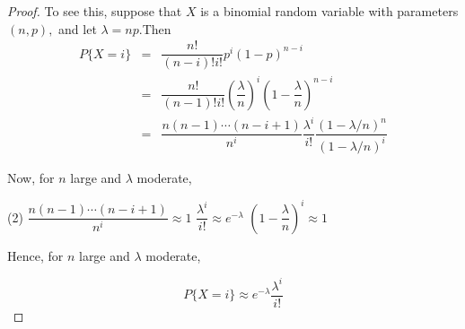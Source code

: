 \begin{proof}

To see this, suppose that $X$ is a binomial random variable with parameters $(n,p),$ and let $\lambda = np$.Then
	\begin{eqnarray*}
		P\{X = i\} &=& \dfrac{n!}{(n-i)!i!}p^i(1 - p)^{n - i}\\
		&=& \dfrac{n!}{(n-1)!i!}\left(\dfrac{\lambda}{n}\right)^i\left(1 - \dfrac{\lambda}{n}\right)^{n - i}\\
		&=& \dfrac{n(n-1)\cdots(n-i+1)}{n^i}\dfrac{\lambda^i}{i!}\dfrac{(1 - \lambda /n)^n}{(1 - \lambda /n)^i}
	\end{eqnarray*}
	
	Now, for $n$ large and $\lambda$ moderate,
	
	\begin{tasks}(2)
		\task[$\bullet$] $\dfrac{n(n-1)\cdots(n-i+1)}{n^i} \approx 1$
		\task[$\bullet$] $\dfrac{\lambda^i}{i!} \approx e^{-\lambda}$
		\task[$\bullet$] $\left( 1 -\dfrac{\lambda}{n}\right)^i \approx 1$
	\end{tasks}
	
	Hence, for $n$ large and $\lambda$ moderate,
	
	$$P\{X = i\} \approx e^{-\lambda}\dfrac{\lambda^i}{i!}$$
\end{proof}























